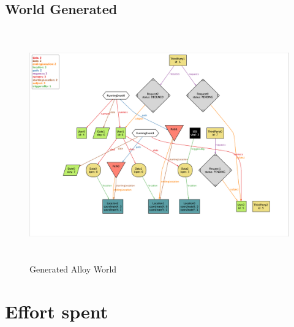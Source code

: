 \documentclass{article}
\begin{document}
\subsection{World Generated}
\begin{figure}[ht]
\centering
    \includegraphics[height=10cm,keepaspectratio, angle=270]{Figures/AlloyWorld}
    \caption{Generated Alloy World}
\end{figure}

\newpage
\section{Effort spent}
\end{document}
